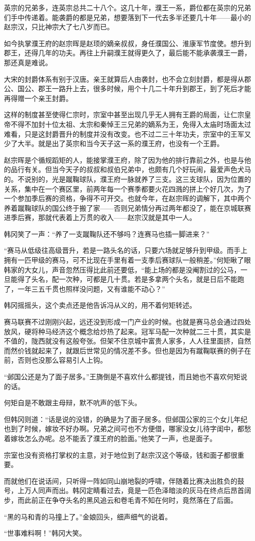 英宗的兄弟多，连英宗总共二十八个。这几十年，濮王一系，爵位都在英宗的兄弟们手中传递着。能袭爵的都是兄弟，想要落到下一代去多半还要几十年——最小的赵宗汉，只比神宗大了七八岁而已。

如今执掌濮王府的赵宗晖是赵顼的嫡亲叔叔，身任濮国公、淮康军节度使。想升到郡王，还得几年的功夫。再往上升嗣濮王就得更久了，最后能不能承袭濮王一爵，那还真是难说。

大宋的封爵体系有别于汉唐。亲王就算后人由袭封，也不会立刻封爵，都是得从郡公、国公、郡王一路升上去，很多时候，用个十几二十年升到郡王，到了死后才能再得赠一个亲王封爵。

这样的制度甚至使得仁宗时，宗室中甚至出现几乎无人拥有王爵的局面，让仁宗皇帝不得不加封十位太祖、太宗和秦悼王三兄弟的嫡系为王，免得入太庙时场面太过难看，只是这封爵晋升的制度并没有改变。也不过二三十年功夫，宗室中的王军又少了大半。就是出了英宗和当今天子这一系的濮王府，也没有一个王爵。

赵宗晖是个循规蹈矩的人，能接掌濮王府，除了因为他的排行靠前之外，也是与他的品行有关。但当今天子的叔叔和叔伯兄弟中，也颇有几个好玩闹，最爱声色犬马的。不说别的，光是蹴鞠球队，濮王府一脉就养了三支。这三支球队，因为位置的关系，集中在一个赛区里，前两年每一个赛季都要火花四溅的拼上个好几次，为了一个参加季后赛的资格，争得不可开交。也就今年，在赵宗晖的调解下，其中两个养着蹴鞠球队的国公终于搬了家——否则兄弟情分再过两年都没了，能在京城联赛进季后赛，那就代表着上万贯的收入——赵宗汉就是其中一人。

韩冈笑了一声：“养了一支蹴鞠队还不够吗？连赛马也插一脚进来？”

“赛马从低级往高级晋升，若是一路头名的话，只要六场就足够升到甲级。而手上拥有一匹甲级的赛马，可不比现在手里有着一支季后赛球队一般稍差。”何矩瞅了眼韩家的大女儿，声音忽然压得比此前还要低，“能上场的都是没阉割过的公马，一旦能得了头名，配一次种，可都是几十贯。若是多拿两个头名，就是日后不能跑了，一年三五千贯也照样没问题，又有谁能不动心？”

韩冈摇摇头，这个卖点还是他告诉冯从义的，用不着何矩转述。

赛马联赛不过刚刚兴起，远还没到形成一门产业的时候。也就是赛马总会通过四处放风，硬将种马经济这个概念给炒热了起来。冠军马配一次种就二三十贯，其实是不值的，陇西就没有这般夸张。但架不住京城中富贵人家多，人人往里面挤，自然而然价钱就起来了，就跟后世常见的情况差不多。但也是因为有蹴鞠联赛的例子在前，否则也没那么容易引人上钩。

“邺国公还是为了面子居多。”王旖倒是不喜欢什么都提钱，而且她也不喜欢何矩说的话。

何矩自是不敢跟主母辩，默不吭声的低下头。

但韩冈则道：“话是说的没错，的确是为了面子居多。但邺国公家的三个女儿年纪也到了时候，嫁妆不好办啊。兄弟之间可也不方便借，哪家没女儿待字闺中，都愁着嫁妆怎么办呢。总不能丢了濮王府的脸面。”他笑了一声，也是面子。

宗室也没有资格打掌权的主意，对于地位到了赵宗汉这个等级，钱和面子都很重要。

而就他们在说话间，只听得一阵如同山崩地裂的呼啸，伴随着比赛决出胜负的鼓号，上万人同声而出。韩冈定睛看过去，竟是一匹色泽暗淡的灰马在终点后昂首阔步，而此前正在争夺头名的黑风追云和卷毛青不知在何时，竟然落在了后面。

“黑的马和青的马撞上了。”金娘回头，细声细气的说着。

“世事难料啊！”韩冈大笑。

